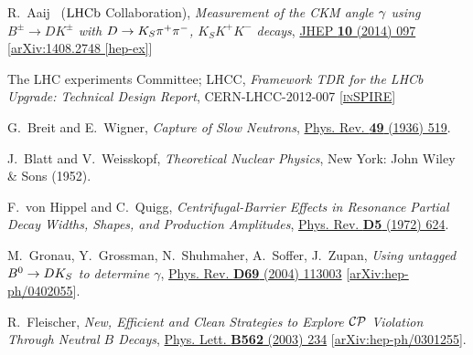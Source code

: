 \documentclass[a4paper,11pt]{article}
\begin{document}
\begin{thebibliography}{99}
R.~Aaij \etal~($\mathrm{LHCb}$ Collaboration), 
\textit{Measurement of the CKM angle $\gamma$ using $B^{\pm}\to DK^{\pm}$ with 
$D\to K_S\pi^+\pi^-$, $K_SK^+K^-$ decays}, 
\href{https://doi.org/10.1007/JHEP10(2014)097}{JHEP \textbf{10} (2014) 097} 
[\href{https://arxiv.org/abs/1408.2748}{arXiv:1408.2748 [hep-ex]}]

The LHC experiments Committee; LHCC,
\textit{Framework TDR for the LHCb Upgrade: Technical Design Report}, 
CERN-LHCC-2012-007 
[\href{http://inspirehep.net/record/1614076/}{\textsc{in}SPIRE}]

G.~Breit and E.~Wigner,
\textit{Capture of Slow Neutrons}, 
\href{https://doi.org/10.1103/PhysRev.49.519}{Phys. Rev. \textbf{49} (1936) 519}.

J.~Blatt and V.~Weisskopf,
\textit{Theoretical Nuclear Physics},
New York: John Wiley \& Sons (1952).

F.~von Hippel and C.~Quigg,
\textit{Centrifugal-Barrier Effects in Resonance Partial Decay Widths,
Shapes, and Production Amplitudes},
\href{https://doi.org/10.1103/PhysRevD.5.624}{Phys. Rev. \textbf{D5} (1972) 624}.

M.~Gronau, Y.~Grossman, N.~Shuhmaher, A.~Soffer, J.~Zupan,
\textit{Using untagged $B^0\to D K_S$ to determine $\gamma$},
\href{https://doi.org/10.1103/PhysRevD.69.113003}{Phys. Rev. \textbf{D69} (2004) 113003} 
[\href{https://arxiv.org/abs/hep-ph/0402055}{arXiv:hep-ph/0402055}].

R.~Fleischer,
\textit{New, Efficient and Clean Strategies to Explore $\mathcal{CP}$ Violation Through Neutral $B$ Decays},
\href{https://doi.org/10.1016/S0370-2693(03)00582-3}{Phys. Lett. \textbf{B562} (2003) 234}
[\href{https://arxiv.org/abs/hep-ph/0301255}{arXiv:hep-ph/0301255}].
\end{thebibliography}
\end{document}
